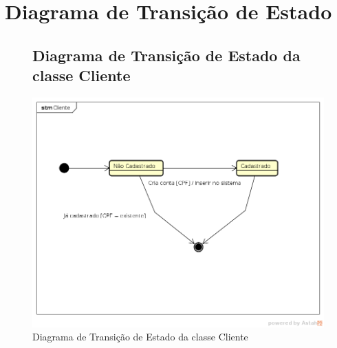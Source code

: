 \documentclass[
	12pt,				%
	openright,
	oneside,			%
	a4paper,			%
	chapter=TITLE,		%
	brazil				%
	]{abntex2}
\begin{document}
\section{Diagrama de Transição de Estado}

\begin{figure}[h!]
\subsection{Diagrama de Transição de Estado da classe Cliente}
	\caption{Diagrama de Transição de Estado da classe Cliente}
	\begin{center}
	    \includegraphics[scale=0.6]{Arquivos/DTE/Cliente}  
	\end{center}
\end{figure}
\end{document}
